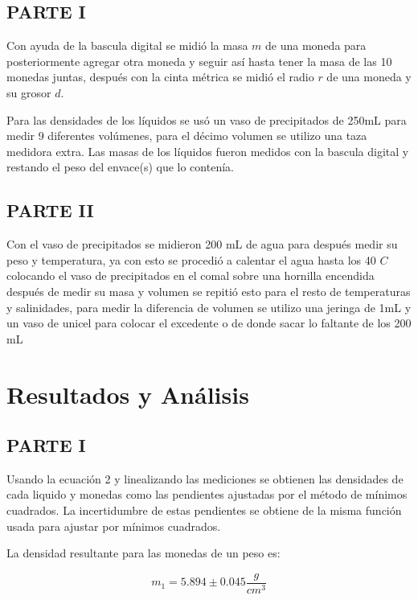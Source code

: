 \documentclass[DIV=calc, paper=a4, fontsize=11pt]{scrartcl}
\begin{document}
\begin{multicols}{2}
\subsection*{PARTE I}

Con ayuda de la bascula digital se midió la masa $m$ de una moneda para posteriormente agregar otra moneda y seguir así hasta tener la masa de las 10 monedas juntas, después con la cinta métrica se midió el radio $r$ de una moneda y su grosor $d$.

Para las densidades de los líquidos se usó un vaso de precipitados de 250mL para medir 9 diferentes volúmenes, para el décimo volumen se utilizo una taza medidora extra. Las masas de los líquidos fueron medidos con la bascula digital y restando el peso del envace(s) que lo contenía.

\subsection*{PARTE II}

Con el vaso de precipitados se midieron 200 mL de agua para después medir su peso y temperatura, ya con esto se procedió a calentar el agua hasta los 40 $C$ colocando el vaso de precipitados en el comal sobre una hornilla encendida después de medir su masa y volumen se repitió esto para el resto de temperaturas y salinidades, para medir la diferencia de volumen se utilizo una jeringa de 1mL y un vaso de  unicel para colocar el excedente o de donde sacar lo faltante de los 200 mL 




\section*{Resultados y Análisis}



\subsection*{PARTE I}
Usando la ecuación 2 y linealizando las mediciones se obtienen las densidades de cada liquido y monedas como las pendientes ajustadas por el método de mínimos cuadrados. La incertidumbre de estas pendientes se obtiene de la misma función usada para ajustar por mínimos cuadrados.

La densidad resultante para las monedas de un peso es:

\begin{equation*}
    m_1 = 5.894 \pm 0.045 \frac{g}{cm^3}
\end{equation*}


\end{multicols}
\end{document}
